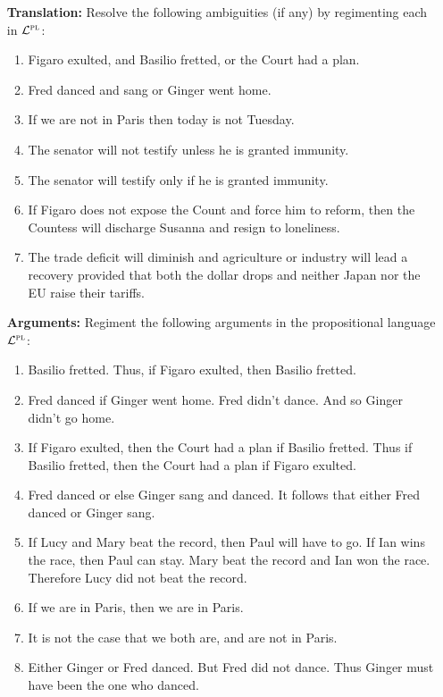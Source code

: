 \documentclass[a4paper, 11pt]{article} %
\begin{document}
\begin{enumerate}[leftmargin=1.2in,labelsep=.15in] 
\item[\bf Translation:] Resolve the following ambiguities (if any) by regimenting each in $\mathcal{L}^{\textsc{pl}}$:
	\begin{enumerate}[label=(\arabic*)]\small
	\item Figaro exulted, and Basilio fretted, or the Court had a plan.
	\item Fred danced and sang or Ginger went home.
	\item If we are not in Paris then today is not Tuesday.
	\item The senator will not testify unless he is granted immunity.
	\item The senator will testify only if he is granted immunity.
	\item If Figaro does not expose the Count and force him to reform, then the Countess will discharge Susanna and resign to loneliness.
	\item The trade deficit will diminish and agriculture or industry will lead a recovery provided that both the dollar drops and neither Japan nor the EU raise their tariffs.
	\end{enumerate}
\item[\bf Arguments:] Regiment the following arguments in the propositional language $\mathcal{L}^{\textsc{pl}}$:
	\begin{enumerate}[label=(\arabic*)]\small
	\item Basilio fretted. Thus, if Figaro exulted, then Basilio fretted.
	\item Fred danced if Ginger went home. Fred didn't dance. And so Ginger didn't go home.
	\item If Figaro exulted, then the Court had a plan if Basilio fretted. Thus if Basilio fretted, then the Court had a plan if Figaro exulted.
	\item Fred danced or else Ginger sang and danced. It follows that either Fred danced or Ginger sang.
	\item If Lucy and Mary beat the record, then Paul will have to go. If Ian wins the race, then Paul can stay. Mary beat the record and Ian won the race. Therefore Lucy did not beat the record.
	\item If we are in Paris, then we are in Paris.
	\item It is not the case that we both are, and are not in Paris.
	\item Either Ginger or Fred danced. But Fred did not dance. Thus Ginger must have been the one who danced.

\end{enumerate}
\end{enumerate}
\end{document}
